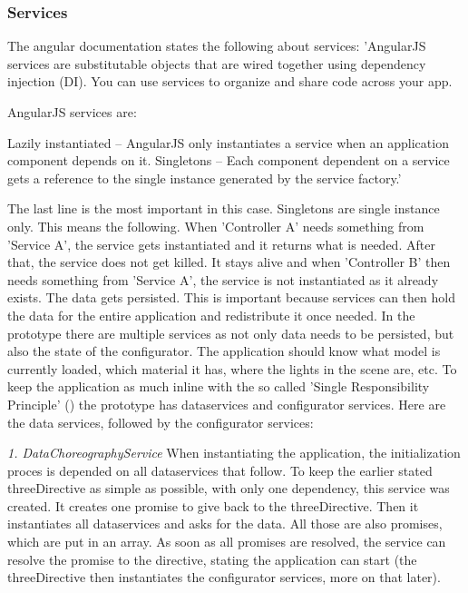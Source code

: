 \subsubsection{Services}
The angular documentation states the following about services:\newline
'AngularJS services are substitutable objects that are wired together using dependency injection (DI). You can use services to organize and share code across your app.

AngularJS services are:

Lazily instantiated – AngularJS only instantiates a service when an application component depends on it.
Singletons – Each component dependent on a service gets a reference to the single instance generated by the service factory.'\newline

The last line is the most important in this case. Singletons are single instance only. This means the following. When 'Controller A' needs something from 'Service A', the service gets instantiated and it returns what is needed. After that, the service does not get killed. It stays alive and when 'Controller B' then needs something from 'Service A', the service is not instantiated as it already exists. The data gets persisted. This is important because services can then hold the data for the entire application and redistribute it once needed.\newline
In the prototype there are multiple services as not only data needs to be persisted, but also the state of the configurator. The application should know what model is currently loaded, which material it has, where the lights in the scene are, etc. To keep the application as much inline with the so called 'Single Responsibility Principle' (\cite{singleResponsibility}) the prototype has dataservices and configurator services. Here are the data services, followed by the configurator services: \linebreak


\textit{1. DataChoreographyService} \newline
When instantiating the application, the initialization proces is depended on all dataservices that follow. To keep the earlier stated threeDirective as simple as possible, with only one dependency, this service was created. It creates one promise to give back to the threeDirective. Then it instantiates all dataservices and asks for the data. All those are also promises, which are put in an array. As soon as all promises are resolved, the service can resolve the promise to the directive, stating the application can start (the threeDirective then instantiates the configurator services, more on that later).

